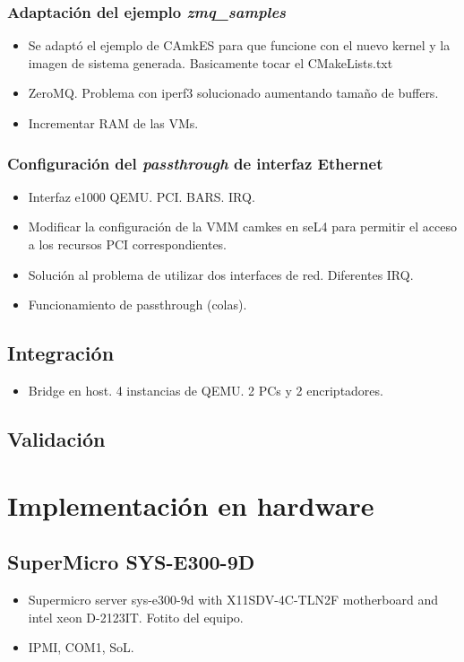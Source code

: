 \subsection{Adaptación del ejemplo \textit{zmq\_samples}}
\begin{itemize}
    \item Se adaptó el ejemplo de CAmkES para que funcione con el nuevo kernel y la imagen de sistema generada. Basicamente tocar el CMakeLists.txt
    \item ZeroMQ. Problema con iperf3 solucionado aumentando tamaño de buffers.
    \item Incrementar RAM de las VMs.
\end{itemize}

\subsection{Configuración del \textit{passthrough} de interfaz Ethernet}
\begin{itemize}
    \item Interfaz e1000 QEMU. PCI. BARS. IRQ.
    \item Modificar la configuración de la VMM camkes en seL4 para permitir el acceso a los recursos PCI correspondientes.
    \item Solución al problema de utilizar dos interfaces de red. Diferentes IRQ.
    \item Funcionamiento de passthrough (colas).
\end{itemize}

\section{Integración}
\begin{itemize}
    \item Bridge en host. 4 instancias de QEMU. 2 PCs y 2 encriptadores.
\end{itemize}


\section{Validación} %

\chapter{Implementación en hardware}
    \section{SuperMicro SYS-E300-9D}
    \begin{itemize}
        \item Supermicro server sys-e300-9d with X11SDV-4C-TLN2F motherboard and intel xeon D-2123IT. Fotito del equipo.
        \item IPMI, COM1, SoL.
    \end{itemize}
